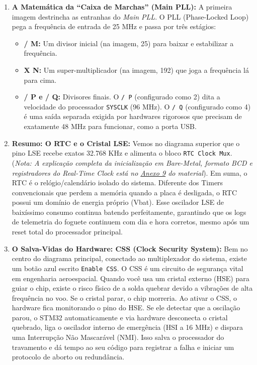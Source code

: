 \documentclass[12pt,a4paper]{article}
\begin{document}
\begin{enumerate}
    \item \textbf{A Matemática da ``Caixa de Marchas'' (Main PLL):} A primeira imagem destrincha as entranhas do \textit{Main PLL}. O PLL (Phase-Locked Loop) pega a frequência de entrada de 25 MHz e passa por três estágios:
    \begin{itemize}
        \item \textbf{/ M:} Um divisor inicial (na imagem, 25) para baixar e estabilizar a frequência.
        \item \textbf{X N:} Um super-multiplicador (na imagem, 192) que joga a frequência lá para cima.
        \item \textbf{/ P e / Q:} Divisores finais. O \texttt{/ P} (configurado como 2) dita a velocidade do processador \texttt{SYSCLK} (96 MHz). O \texttt{/ Q} (configurado como 4) é uma saída separada exigida por hardwares rigorosos que precisam de exatamente 48 MHz para funcionar, como a porta USB.
    \end{itemize}
    \item \textbf{Resumo: O RTC e o Cristal LSE:} Vemos no diagrama superior que o pino LSE recebe exatos 32.768 KHz e alimenta o bloco \texttt{RTC Clock Mux}. (\textit{Nota: A explicação completa da inicialização em Bare-Metal, formato BCD e registradores do Real-Time Clock está no \hyperref[anexo:9]{Anexo 9} do material}). Em suma, o RTC é o relógio/calendário isolado do sistema. Diferente dos Timers convencionais que perdem a memória quando a placa é desligada, o RTC possui um domínio de energia próprio (Vbat). Esse oscilador LSE de baixíssimo consumo continua batendo perfeitamente, garantindo que os logs de telemetria do foguete continuem com dia e hora corretos, mesmo após um reset total do processador principal.
    \item \textbf{O Salva-Vidas do Hardware: CSS (Clock Security System):} Bem no centro do diagrama principal, conectado ao multiplexador do sistema, existe um botão azul escrito \texttt{Enable CSS}. O CSS é um circuito de segurança vital em engenharia aeroespacial. Quando você usa um cristal externo (HSE) para guiar o chip, existe o risco físico de a solda quebrar devido a vibrações de alta frequência no voo. Se o cristal parar, o chip morreria. Ao ativar o CSS, o hardware fica monitorando o pino do HSE. Se ele detectar que a oscilação parou, o STM32 automaticamente e via hardware desconecta o cristal quebrado, liga o oscilador interno de emergência (HSI a 16 MHz) e dispara uma Interrupção Não Mascarável (NMI). Isso salva o processador do travamento e dá tempo ao seu código para registrar a falha e iniciar um protocolo de aborto ou redundância.

\end{enumerate}
\end{document}
